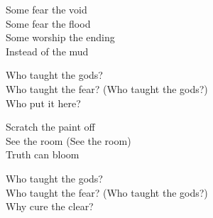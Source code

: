 \begin{lyrics}
Some fear the void\\
Some fear the flood\\
Some worship the ending\\
Instead of the mud

Who taught the gods?\\
Who taught the fear?
(Who taught the gods?)\\
Who put it here?

Scratch the paint off\\
See the room
(See the room)\\
Truth can bloom

Who taught the gods?\\
Who taught the fear?
(Who taught the gods?)\\
Why cure the clear?
\end{lyrics}

